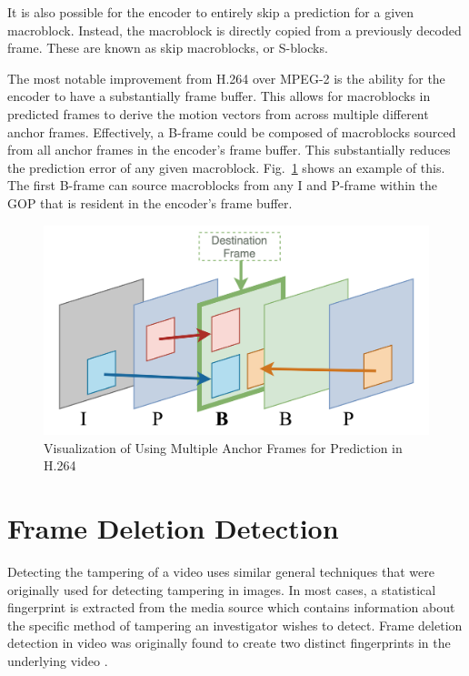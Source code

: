 It is also possible for the encoder to entirely skip a prediction for a given macroblock. Instead, the macroblock is directly copied from a previously decoded frame. These are known as skip macroblocks, or S-blocks.

The most notable improvement from H.264 over MPEG-2 is the ability for the encoder to have a substantially frame buffer. This allows for macroblocks in predicted frames to derive the motion vectors from across multiple different anchor frames. Effectively, a B-frame could be composed of macroblocks sourced from all anchor frames in the encoder's frame buffer. This substantially reduces the prediction error of any given macroblock. Fig.~\ref{multipred} shows an example of this. The first B-frame can source macroblocks from any I and P-frame within the GOP that is resident in the encoder's frame buffer.

\begin{figure}[htbp]
\centerline{\includegraphics[width=0.9\linewidth]{Background/multi_frame_pred.png}}
\caption{Visualization of Using Multiple Anchor Frames for Prediction in H.264}
\label{multipred}
\end{figure}

\section{Frame Deletion Detection}

Detecting the tampering of a video uses similar general techniques that were originally used for detecting tampering in images. In most cases, a statistical fingerprint is extracted from the media source which contains information about the specific method of tampering an investigator wishes to detect. Frame deletion detection in video was originally found to create two distinct fingerprints in the underlying video \cite{wang}. 


